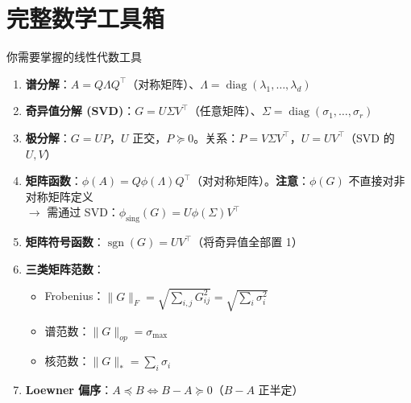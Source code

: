 \documentclass[aspectratio=169,10pt]{ctexbeamer}
\newcommand{\diag}{\operatorname{diag}}
\DeclareMathOperator{\sgn}{sgn}
\begin{document}
\section{完整数学工具箱}

\begin{frame}{你需要掌握的线性代数工具}
\begin{enumerate}
  \item \textbf{谱分解}：$A=Q\Lambda Q^\top$（对称矩阵）、$\Lambda=\diag(\lambda_1,\ldots,\lambda_d)$
  \item \textbf{奇异值分解 (SVD)}：$G=U\Sigma V^\top$（任意矩阵）、$\Sigma=\diag(\sigma_1,\ldots,\sigma_r)$
  \item \textbf{极分解}：$G=UP$，$U$ 正交，$P\succeq0$。关系：$P=V\Sigma V^\top$，$U=UV^\top$（SVD 的 $U,V$）
  \item \textbf{矩阵函数}：$\phi(A)=Q\phi(\Lambda)Q^\top$（对对称矩阵）。\textbf{注意}：$\phi(G)$ 不直接对非对称矩阵定义 \\
  $\to$ 需通过 SVD：$\phi_{\text{sing}}(G)=U\phi(\Sigma)V^\top$
  \item \textbf{矩阵符号函数}：$\sgn(G)=UV^\top$（将奇异值全部置 1）
  \item \textbf{三类矩阵范数}：
  \begin{itemize}
    \item Frobenius：$\|G\|_F = \sqrt{\sum_{i,j}G_{ij}^2} = \sqrt{\sum_i\sigma_i^2}$
    \item 谱范数：$\|G\|_{op} = \sigma_{\max}$
    \item 核范数：$\|G\|_* = \sum_i\sigma_i$
  \end{itemize}
  \item \textbf{Loewner 偏序}：$A\preceq B \iff B-A\succeq0$（$B-A$ 正半定）
\end{enumerate}
\end{frame}
\end{document}

